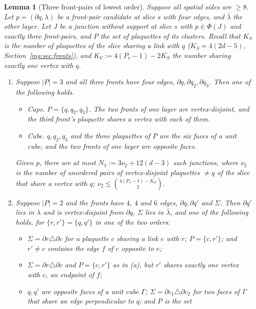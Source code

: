 \documentclass[11pt,a4paper]{article}
\newtheorem{lemma}[theorem]{Lemma}
\theoremstyle{definition}
\theoremstyle{remark}
\begin{document}
\begin{lemma}[Three front-pairs of lowest order]\label{mg:lem:threelow}
Suppose all spatial sides are $\ge8$. Let $p=(\partial q,\lambda)$ be a front-pair candidate at slice $s$ with four edges, and $\bar\lambda$ the other layer. Let $J$ be a junction
without support at slice $s$ with $p\in\Phi(J)$ and exactly three front-pairs, and $P$ the set of plaquettes of its clusters. Recall that $K_S$ is the number of plaquettes of the slice sharing
a link with $q$ ($K_S=4(2d-5)$, Section~\ref{mg:sec:fronts}), and $K_V:=4(P_v-1)-2K_S$ the number sharing exactly one vertex with $q$.
\begin{enumerate}[label=(\roman*)]
\item Suppose $|P|=3$ and all three fronts have four edges, $\partial q,\partial q_2,\partial q_3$. Then one of the following holds.
\begin{itemize}
\item \emph{Caps.} $P=\{q,q_2,q_3\}$. The two fronts of one layer are vertex-disjoint, and the third front's plaquette shares a vertex with each of them.
\item \emph{Cube.} $q,q_2,q_3$ and the three plaquettes of $P$ are the six faces of a unit cube, and the two fronts of one layer are opposite faces.
\end{itemize}
Given $p$, there are at most $N_3:=3\nu_2+12(d-3)$ such junctions, where $\nu_2$ is the number of unordered pairs of vertex-disjoint plaquettes $\ne q$ of the slice that share a vertex with
$q$; $\nu_2\le\binom{4(P_v-1)-K_S}2$.
\item Suppose $|P|=2$ and the fronts have $4$, $4$ and $6$ edges, $\partial q,\partial q'$ and $\Sigma$. Then $\partial q'$ lies in $\lambda$ and is vertex-disjoint from $\partial q$, $\Sigma$
lies in $\bar\lambda$, and one of the following holds, for $\{r,r'\}=\{q,q'\}$ in one of the two orders:
\begin{itemize}
\item[(a)] $\Sigma=\partial r\triangle\partial c$ for a plaquette $c$ sharing a link $e$ with $r$; $P=\{c,r'\}$; and $r'\ne c$ contains the edge $f$ of $c$ opposite to $e$;
\item[(b)] $\Sigma=\partial r\triangle\partial c$ and $P=\{c,r'\}$ as in (a), but $r'$ shares exactly one vertex with $c$, an endpoint of $f$;
\item[(c)] $q,q'$ are opposite faces of a unit cube $\Gamma$; $\Sigma=\partial c_1\triangle\partial c_2$ for two faces of $\Gamma$ that share an edge perpendicular to $q$; and $P$ is the set

\end{itemize}
\end{enumerate}
\end{lemma}
\end{document}
